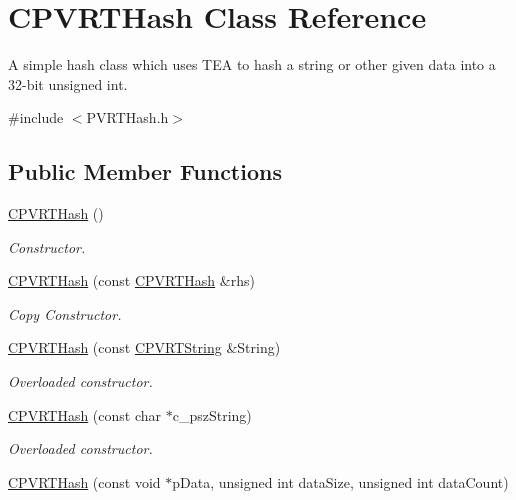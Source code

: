 \hypertarget{class_c_p_v_r_t_hash}{\section{C\+P\+V\+R\+T\+Hash Class Reference}
\label{class_c_p_v_r_t_hash}
}


A simple hash class which uses T\+E\+A to hash a string or other given data into a 32-\/bit unsigned int.  




{\ttfamily \#include $<$P\+V\+R\+T\+Hash.\+h$>$}

\subsection*{Public Member Functions}
\begin{DoxyCompactItemize}
\item 
\hyperlink{class_c_p_v_r_t_hash_a8c438349fa4846a11e4cb0126eb2f252}{C\+P\+V\+R\+T\+Hash} ()
\begin{DoxyCompactList}\small\item\em Constructor. \end{DoxyCompactList}\item 
\hyperlink{class_c_p_v_r_t_hash_af4ff689bb0d6a3cbaecf59409667ba11}{C\+P\+V\+R\+T\+Hash} (const \hyperlink{class_c_p_v_r_t_hash}{C\+P\+V\+R\+T\+Hash} \&rhs)
\begin{DoxyCompactList}\small\item\em Copy Constructor. \end{DoxyCompactList}\item 
\hyperlink{class_c_p_v_r_t_hash_a133f1cd5ad1f87778c1a9bb9d8a4c2e9}{C\+P\+V\+R\+T\+Hash} (const \hyperlink{class_c_p_v_r_t_string}{C\+P\+V\+R\+T\+String} \&String)
\begin{DoxyCompactList}\small\item\em Overloaded constructor. \end{DoxyCompactList}\item 
\hyperlink{class_c_p_v_r_t_hash_add30b60d4762a296e09f29f6f07e3d12}{C\+P\+V\+R\+T\+Hash} (const char $\ast$c\+\_\+psz\+String)
\begin{DoxyCompactList}\small\item\em Overloaded constructor. \end{DoxyCompactList}\item 
\hyperlink{class_c_p_v_r_t_hash_a0ad096c334552bc813fa073080c26cdc}{C\+P\+V\+R\+T\+Hash} (const void $\ast$p\+Data, unsigned int data\+Size, unsigned int data\+Count)

\end{DoxyCompactItemize}
